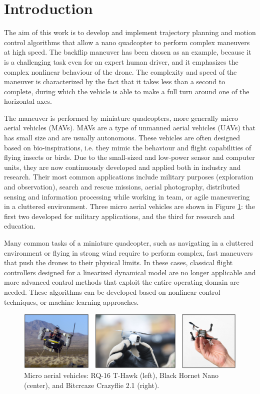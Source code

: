 \section{Introduction}
The aim of this work is to develop and implement trajectory planning and motion control algorithms that allow a nano quadcopter to perform complex maneuvers at high speed. The backflip maneuver has been chosen as an example, because it is a challenging task even for an expert human driver, and it emphasizes the complex nonlinear behaviour of the drone. The complexity and speed of the maneuver is characterized by the fact that it takes less than a second to complete, during which the vehicle is able to make a full turn around one of the horizontal axes.

The maneuver is performed by miniature quadcopters, more generally micro aerial vehicles (MAVs). MAVs are a type of unmanned aerial vehicles (UAVs) that has small size and are usually autonomous. These vehicles are often designed based on bio-inspirations, i.e. they mimic the behaviour and flight capabilities of flying insects or birds. Due to the small-sized and low-power sensor and computer units, they are now continuously developed and applied both in industry and research. Their most common applications include military purposes (exploration and observation), search and rescue missions, aerial photography, distributed sensing and information processing while working in team, or agile maneuvering in a cluttered environment. Three micro aerial vehicles are shown in Figure \ref{fig:intro}: the first two developed for military applications, and the third for research and education.

Many common tasks of a miniature quadcopter, such as navigating in a cluttered environment or flying in strong wind require to perform complex, fast maneuvers that push the drones to their physical limits. In these cases, classical flight controllers designed for a linearized dynamical model are no longer applicable and more advanced control methods that exploit the entire operating domain are needed. These algorithms can be developed based on nonlinear control techniques, or machine learning approaches.

\begin{figure}[b]
    \centering
    \includegraphics{Fig/intro.png}
    \caption[Micro aerial vehicles]{Micro aerial vehicles: RQ-16 T-Hawk (left), Black Hornet Nano (center), and Bitcrcaze Crazyflie 2.1 (right).}
    \label{fig:intro}
\end{figure}

